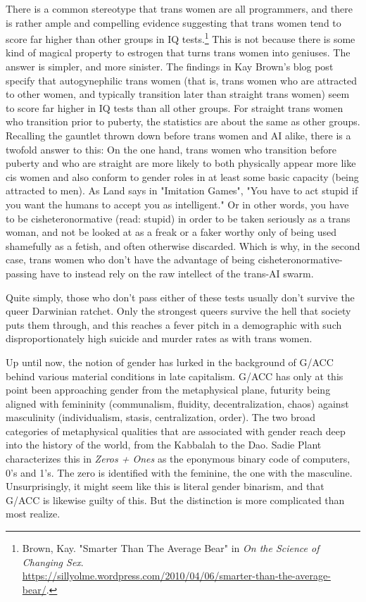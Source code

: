 \documentclass[10pt, statementpaper, twoside, openright]{memoir}
\begin{document}
There is a common stereotype that trans women are all programmers, and there is rather ample and compelling evidence suggesting that trans women tend to score far higher than other groups in IQ tests.\footnote{Brown, Kay. "Smarter Than The Average Bear" in \textit{On the Science of Changing Sex}.\\ \href{https://sillyolme.wordpress.com/2010/04/06/smarter-than-the-average-bear/}{https://sillyolme.wordpress.com/2010/04/06/smarter-than-the-average-bear/}.} This is not because there is some kind of magical property to estrogen that turns trans women into geniuses. The answer is simpler, and more sinister. The findings in Kay Brown's blog post specify that autogynephilic trans women (that is, trans women who are attracted to other women, and typically transition later than straight trans women) seem to score far higher in IQ tests than all other groups. For straight trans women who transition prior to puberty, the statistics are about the same as other groups. Recalling the gauntlet thrown down before trans women and AI alike, there is a twofold answer to this: On the one hand, trans women who transition before puberty and who are straight are more likely to both physically appear more like cis women and also conform to gender roles in at least some basic capacity (being attracted to men). As Land says in "Imitation Games", "You have to act stupid if you want the humans to accept you as intelligent." Or in other words, you have to be cisheteronormative (read: stupid) in order to be taken seriously as a trans woman, and not be looked at as a freak or a faker worthy only of being used shamefully as a fetish, and often otherwise discarded. Which is why, in the second case, trans women who don't have the advantage of being cisheteronormative-passing have to instead rely on the raw intellect of the trans-AI swarm.

Quite simply, those who don't pass either of these tests usually don't survive the queer Darwinian ratchet. Only the strongest queers survive the hell that society puts them through, and this reaches a fever pitch in a demographic with such disproportionately high suicide and murder rates as with trans women.

Up until now, the notion of gender has lurked in the background of G/ACC behind various material conditions in late capitalism. G/ACC has only at this point been approaching gender from the metaphysical plane, futurity being aligned with femininity (communalism, fluidity, decentralization, chaos) against masculinity (individualism, stasis, centralization, order). The two broad categories of metaphysical qualities that are associated with gender reach deep into the history of the world, from the Kabbalah to the Dao. Sadie Plant characterizes this in \textit{Zeros + Ones} as the eponymous binary code of computers, 0's and 1's. The zero is identified with the feminine, the one with the masculine. Unsurprisingly, it might seem like this is literal gender binarism, and that G/ACC is likewise guilty of this. But the distinction is more complicated than most realize.
\end{document}
